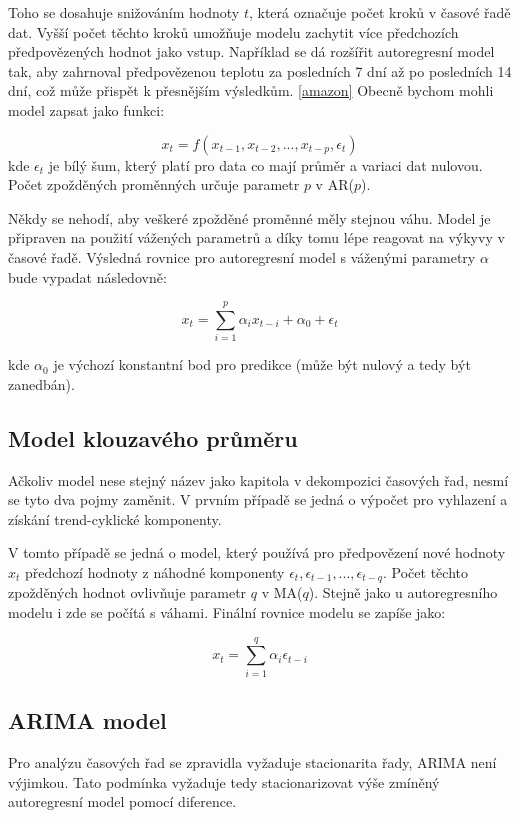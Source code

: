 \documentclass[FM,BP,fonts]{tulthesis}
\begin{document}
Toho se dosahuje snižováním hodnoty $t$, která označuje počet kroků v časové řadě dat. Vyšší počet těchto kroků umožňuje modelu zachytit více předchozích předpovězených hodnot jako vstup. Například se dá rozšířit autoregresní model tak, aby zahrnoval předpovězenou teplotu za posledních 7 dní až po posledních 14 dní, což může přispět k přesnějším výsledkům. \ref{amazon} Obecně bychom mohli model zapsat jako funkci: 

\begin{equation}
	x_t = f(x_{t-1}, x_{t-2}, ..., x_{t-p}, \epsilon_t)
\end{equation}
kde $\epsilon_t$ je bílý šum, který platí pro data co mají průměr a variaci dat nulovou. Počet zpožděných proměnných určuje parametr $p$ v AR($p$).

Někdy se nehodí, aby veškeré zpožděné proměnné měly stejnou váhu. Model je připraven na použití vážených parametrů a díky tomu lépe reagovat na výkyvy v časové řadě. Výsledná rovnice pro autoregresní model s váženými parametry $\alpha$ bude vypadat následovně: 

\begin{equation}
	x_t =    \sum_{i=1}^{p}\alpha_ix_{t-i} + \alpha_0 + \epsilon_t
\end{equation}

kde $\alpha_0$  je výchozí konstantní bod pro predikce (může být nulový a tedy být zanedbán). 

\subsection{Model klouzavého průměru}
Ačkoliv model nese stejný název jako kapitola v dekompozici časových řad, nesmí se tyto dva pojmy zaměnit. V prvním případě se jedná o výpočet pro vyhlazení a získání trend-cyklické komponenty. 

V tomto případě se jedná o model, který používá pro předpovězení nové hodnoty $x_t$ předchozí hodnoty z náhodné komponenty $\epsilon_t, \epsilon_{t-1}, ..., \epsilon_{t-q}$. Počet těchto zpožděných hodnot ovlivňuje parametr $q$ v MA($q$). Stejně jako u autoregresního modelu i zde se počítá s váhami. Finální rovnice modelu se zapíše jako: 

\begin{equation}
	x_t =  \sum_{i=1}^{q}\alpha_i\epsilon_{t-i}
\end{equation}


\subsection{ARIMA model}
Pro analýzu časových řad se zpravidla vyžaduje stacionarita řady, ARIMA není výjimkou. Tato podmínka vyžaduje tedy stacionarizovat výše zmíněný autoregresní model pomocí diference. 
\end{document}
